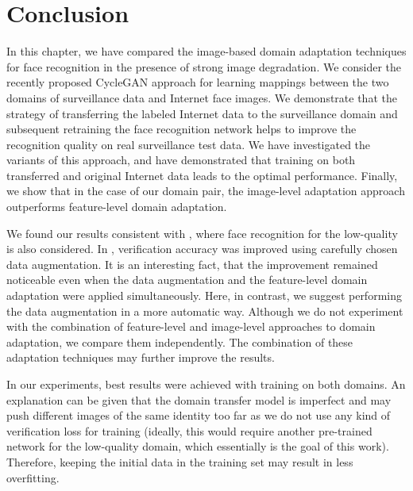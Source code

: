 
\section{Conclusion}
\label{sect:conclusion}


In this chapter, we have compared the image-based domain adaptation techniques for face recognition in the presence of strong image degradation. We consider the recently proposed CycleGAN approach for learning mappings between the two domains of surveillance data and Internet face images. We demonstrate that the strategy of transferring the labeled Internet data to the surveillance domain and subsequent retraining the face recognition network helps to improve the recognition quality on real surveillance test data. We have investigated the variants of this approach, and have demonstrated that training on both transferred and original Internet data leads to the optimal performance. Finally, we show that in the case of our domain pair, the image-level adaptation approach outperforms feature-level domain adaptation. 

We found our results consistent with \cite{SohnLZY0C17}, where face recognition for the low-quality is also considered. In \cite{SohnLZY0C17},  verification accuracy was improved using carefully chosen data augmentation. It is an interesting fact, that the improvement remained noticeable even when the data augmentation and the feature-level domain adaptation were applied simultaneously. Here, in contrast, we suggest performing the data augmentation in a more automatic way. Although we do not experiment with the combination of feature-level and image-level approaches to domain adaptation, we compare them independently. The combination of these adaptation techniques may further improve the results.


In our experiments, best results were achieved with training on both domains. An explanation can be given that the domain transfer model is imperfect and may push different images of the same identity too far as we do not use any kind of verification loss for training (ideally, this would require another pre-trained network for the low-quality domain, which essentially is the goal of this work). Therefore, keeping the initial data in the training set may result in less overfitting. %

